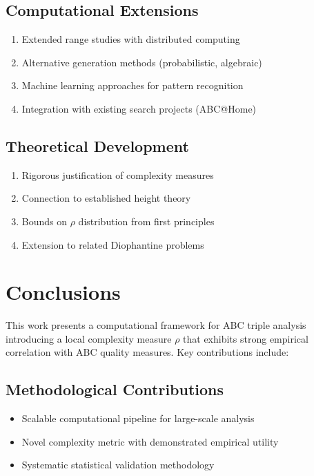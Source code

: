 \documentclass[11pt,a4paper]{article}
\begin{document}
\subsection{Computational Extensions}
\begin{enumerate}
    \item Extended range studies with distributed computing
    \item Alternative generation methods (probabilistic, algebraic)
    \item Machine learning approaches for pattern recognition
    \item Integration with existing search projects (ABC@Home)
\end{enumerate}

\subsection{Theoretical Development}
\begin{enumerate}
    \item Rigorous justification of complexity measures
    \item Connection to established height theory
    \item Bounds on $\rho$ distribution from first principles
    \item Extension to related Diophantine problems
\end{enumerate}

\section{Conclusions}

This work presents a computational framework for ABC triple analysis introducing a local complexity measure $\rho$ that exhibits strong empirical correlation with ABC quality measures. Key contributions include:

\subsection{Methodological Contributions}
\begin{itemize}
    \item Scalable computational pipeline for large-scale analysis
    \item Novel complexity metric with demonstrated empirical utility
    \item Systematic statistical validation methodology
\end{itemize}
\end{document}
